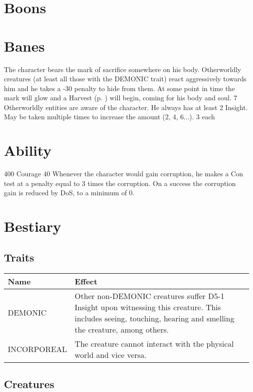 \section{Boons}
\section{Banes}
	{The character bears the mark of sacrifice somewhere on his body.
		Otherworldly creatures (at least all those with the DEMONIC trait)
		react aggressively towards him
		and he takes a -30 penalty to hide from them.
		At some point in time the mark will glow and a Harvest (p. \pageref{anomaly:harvest}) will begin,
		coming for his body and soul.
	}
	{7}
	{}
	{Otherworldly entities are aware of the character.
		He always has at least 2 Insight.
		May be taken multiple times to increase the amount (2, 4, 6...).}
	{3}
	{each}
\section{Ability}
	{400}
	{Courage 40}
	{Whenever the character would gain corruption,
		he makes a Con test at a penalty
		equal to 3 times the corruption.
		On a success the corruption gain is reduced by DoS, to a minimum of 0.}
\section{Bestiary}
\subsection{Traits}
\begin{tabularx}{\columnwidth}{l|X}
	Name & Effect \\ \hline
	DEMONIC & Other non-DEMONIC creatures suffer D5-1 Insight upon witnessing this creature. 
	This includes seeing, touching, hearing and smelling the creature, among others. \\
	\hline
	INCORPOREAL & The creature cannot interact with the physical world and vice versa.
\end{tabularx}

\subsection{Creatures}
